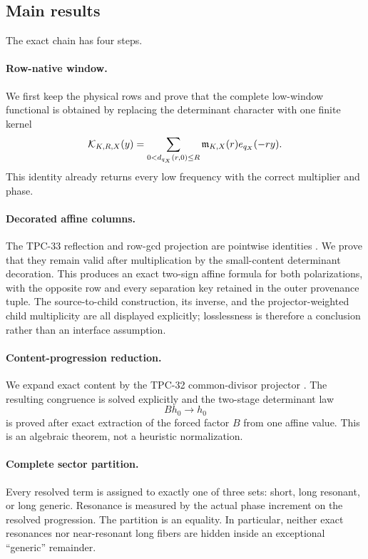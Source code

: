 \subsection{Main results}

The exact chain has four steps.

\paragraph{Row-native window.}
We first keep the physical rows and prove that the complete
low-window functional is obtained by replacing the determinant
character with one finite kernel
\[
 \mathcal K_{K,R,X}(y)
 =
 \sum_{0<d_{q_X}(r,0)\le R}
 \mathfrak m_{K,X}(r)e_{q_X}(-ry).
\]
This identity already returns every low frequency with the correct
multiplier and phase.

\paragraph{Decorated affine columns.}
The TPC-33 reflection and row-gcd projection are pointwise identities
\citep{WangTPC33}.  We prove that they remain valid after multiplication
by the small-content determinant decoration.  This produces an exact
two-sign affine formula for both polarizations, with the opposite row
and every separation key retained in the outer provenance tuple.  The
source-to-child construction, its inverse, and the
projector-weighted child multiplicity are all displayed explicitly;
losslessness is therefore a conclusion rather than an interface
assumption.

\paragraph{Content-progression reduction.}
We expand exact content by the TPC-32 common-divisor projector
\citep{WangTPC32}.  The resulting congruence is solved explicitly and
the two-stage determinant law
\[
 Bh_0\longrightarrow h_0
\]
is proved after exact extraction of the forced factor \(B\) from one
affine value.  This is an algebraic theorem, not a heuristic
normalization.

\paragraph{Complete sector partition.}
Every resolved term is assigned to exactly one of three sets:
short, long resonant, or long generic.  Resonance is measured by the
actual phase increment on the resolved progression.  The partition
is an equality.  In particular, neither exact resonances nor
near-resonant long fibers are hidden inside an exceptional
``generic'' remainder.


